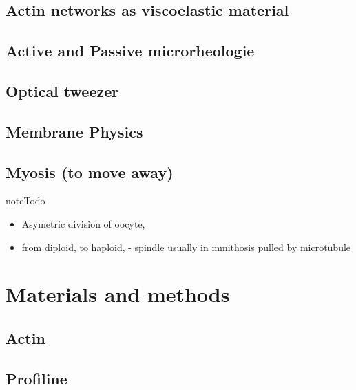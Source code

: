 \documentclass[A4paperpaper,11pt,english]{sphinxmanual}
\begin{document}
\section{Actin networks as viscoelastic material}
\label{parts/part1:actin-networks-as-viscoelastic-material}

\section{Active and Passive microrheologie}
\label{parts/part1:active-and-passive-microrheologie}

\section{Optical tweezer}
\label{parts/part1:optical-tweezer}

\section{Membrane Physics}
\label{parts/part1:membrane-physics}

\section{Myosis (to move away)}
\label{parts/part1:myosis-to-move-away}
\begin{notice}{note}{Todo}
\begin{itemize}
\item {} 
Asymetric division of oocyte,

\item {} 
from diploid, to haploid,
- spindle usually in mmithosis pulled by microtubule

\end{itemize}
\end{notice}


\chapter{Materials and methods}
\label{parts/part2::doc}\label{parts/part2:materials-and-methods}

\section{Actin}
\label{parts/part2:actin}

\section{Profiline}
\label{parts/part2:profiline}
\end{document}
